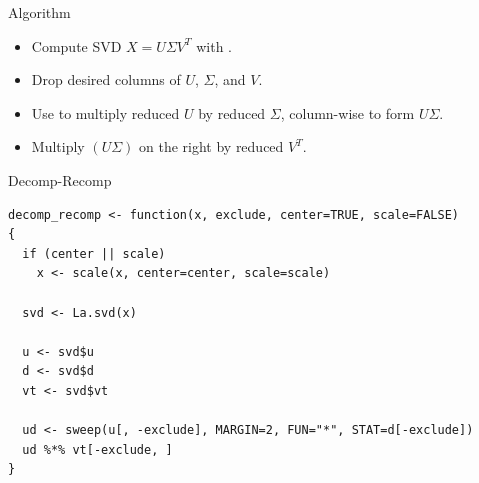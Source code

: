 \begin{frame}
  \begin{block}{Algorithm}
    \begin{itemize}
      \item Compute SVD $X = U\Sigma V^T$ with .
      \item Drop desired columns of $U$, $\Sigma$, and $V$.
      \item Use  to multiply reduced $U$ by reduced $\Sigma$, column-wise to form $U\Sigma$.
      \item Multiply $(U\Sigma)$ on the right by reduced $V^T$.
    \end{itemize}
  \end{block}
\end{frame}



\begin{frame}[fragile]
\fontsize{8pt}{10}\selectfont
\begin{block}{Decomp-Recomp}
\begin{lstlisting}[title=Serial And Parallel]
decomp_recomp <- function(x, exclude, center=TRUE, scale=FALSE)
{
  if (center || scale)
    x <- scale(x, center=center, scale=scale)
  
  svd <- La.svd(x)
  
  u <- svd$u
  d <- svd$d
  vt <- svd$vt
  
  ud <- sweep(u[, -exclude], MARGIN=2, FUN="*", STAT=d[-exclude])
  ud %*% vt[-exclude, ]
}
\end{lstlisting}
\end{block}
\end{frame}
